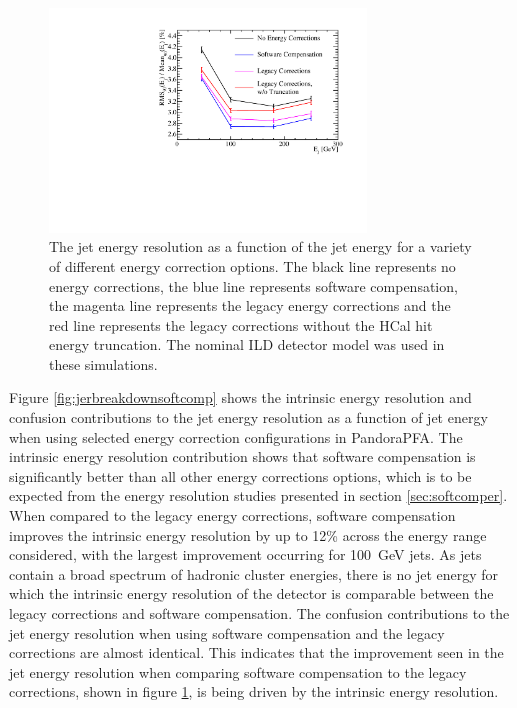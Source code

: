 \begin{figure}[h!]
\includegraphics[width=0.75\textwidth]{EnergyEstimators/Plots/SoftComp/JetEnergyResolution/JER_vs_JetEnergy_Default.pdf}
\caption[The jet energy resolution as a function of the jet energy for a variety of different energy correction options.  The black line represents no energy corrections, the blue line represents software compensation, the magenta line represents the legacy energy corrections and the red line represents the legacy corrections without the HCal hit energy truncation.  The nominal ILD detector model was used in these simulations.]{The jet energy resolution as a function of the jet energy for a variety of different energy correction options.  The black line represents no energy corrections, the blue line represents software compensation, the magenta line represents the legacy energy corrections and the red line represents the legacy corrections without the HCal hit energy truncation.  The nominal ILD detector model was used in these simulations.}
\label{fig:jersoftcomp}
\end{figure}

Figure \ref{fig:jerbreakdownsoftcomp} shows the intrinsic energy resolution and confusion contributions to the jet energy resolution as a function of jet energy when using selected energy correction configurations in PandoraPFA.  The intrinsic energy resolution contribution shows that software compensation is significantly better than all other energy corrections options, which is to be expected from the energy resolution studies presented in section \ref{sec:softcomper}.  When compared to the legacy energy corrections, software compensation improves the intrinsic energy resolution by up to 12\% across the energy range considered, with the largest improvement occurring for 100~GeV jets.  As jets contain a broad spectrum of hadronic cluster energies, there is no jet energy for which the intrinsic energy resolution of the detector is comparable between the legacy corrections and software compensation.  The confusion contributions to the jet energy resolution when using software compensation and the legacy corrections are almost identical.  This indicates that the improvement seen in the jet energy resolution when comparing software compensation to the legacy corrections, shown in figure \ref{fig:jersoftcomp}, is being driven by the intrinsic energy resolution.  


